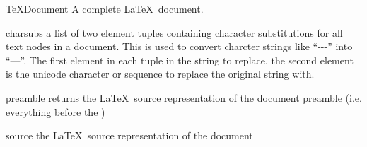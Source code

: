 \begin{classdesc}{TeXDocument}{}
A complete \LaTeX\ document.
\end{classdesc}

\begin{memberdesc}[TeXDocument]{charsubs}
a list of two element tuples containing character substitutions for all
text nodes in a document.  This is used to convert charcter strings
like ``-{}-{}-'' into ``---''.  The first element in each tuple in the
string to replace, the second element is the unicode character or 
sequence to replace the original string with.
\end{memberdesc}

\begin{memberdesc}[TeXDocument]{preamble}
returns the \LaTeX\ source representation of the document preamble 
(i.e. everything before the )
\end{memberdesc}

\begin{memberdesc}[TeXDocument]{source}
the \LaTeX\ source representation of the document 
\end{memberdesc}
